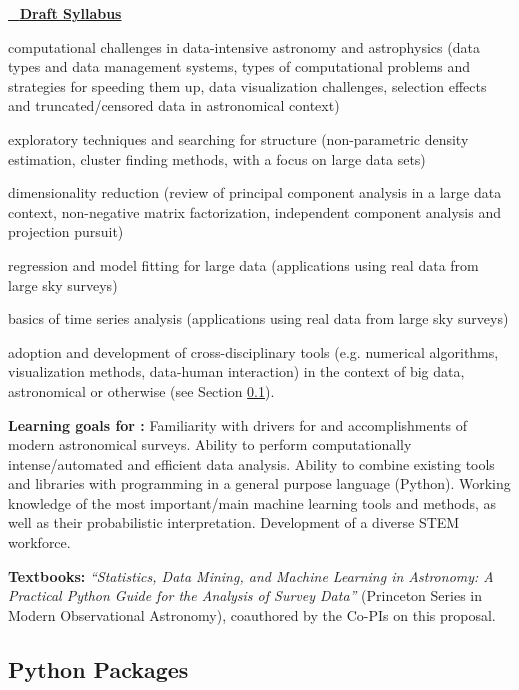 \vskip 0.2in
\item \underline{\astrocl~ {\bf Draft Syllabus}}\\
\bit
\item computational challenges in data-intensive astronomy and astrophysics 
(data types and data management systems, types of computational problems and 
strategies for speeding them up, data visualization challenges,
selection effects and truncated/censored data in astronomical context)
\item exploratory techniques and searching for structure (non-parametric density estimation,
cluster finding methods, with a focus on large data sets)
\item dimensionality reduction (review of principal component analysis in a large data context,
non-negative matrix factorization, independent component analysis and projection pursuit)
\item regression and model fitting for large data (applications using real data from large sky surveys)
\item basics of time series analysis (applications using real data from large sky surveys)
\item adoption and development of cross-disciplinary tools (e.g. numerical algorithms, visualization 
methods, data-human interaction) in the context of big data, astronomical or otherwise 
(see Section \ref{sec:Python}).
\eit

\item[]{\bf Learning goals for \astrocl:}  Familiarity with drivers for and accomplishments 
of modern astronomical surveys. Ability to perform computationally intense/automated and 
efficient data analysis. Ability to combine existing tools and libraries with programming in a 
general purpose language (Python). Working knowledge of the most important/main machine 
learning tools and methods, as well as their probabilistic interpretation. Development of a 
diverse STEM workforce. 

{\bf Textbooks:} {\it ``Statistics, Data Mining, and Machine Learning in
  Astronomy: A Practical Python Guide for the Analysis of Survey
  Data''} (Princeton Series in Modern Observational Astronomy),  coauthored by the Co-PIs on 
this proposal.

\eit

\subsection{Python Packages} 
\label{sec:Python}


